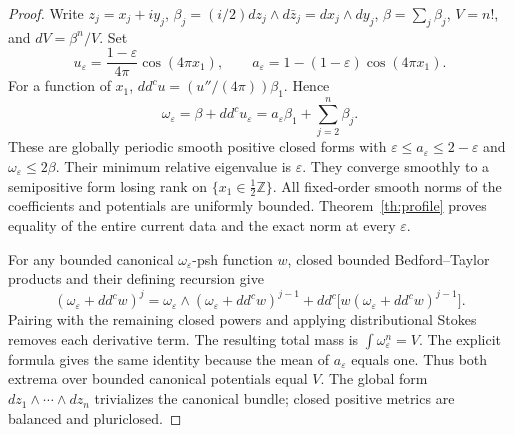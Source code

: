 \documentclass[11pt]{article}
\newcommand{\ddc}{dd^c}
\theoremstyle{remark}\newtheorem{remark}[theorem]{Remark}
\begin{document}
\begin{proof}
Write $z_j=x_j+iy_j$,
$\beta_j=(i/2)dz_j\wedge d\bar z_j=dx_j\wedge dy_j$,
$\beta=\sum_j\beta_j$, $V=n!$, and $dV=\beta^n/V$.
Set
\[
 u_\varepsilon=\frac{1-\varepsilon}{4\pi}\cos(4\pi x_1),
 \qquad a_\varepsilon=1-(1-\varepsilon)\cos(4\pi x_1).
\]
For a function of $x_1$, $\ddc u=(u''/(4\pi))\beta_1$.
Hence
\[
 \omega_\varepsilon=\beta+\ddc u_\varepsilon
 =a_\varepsilon\beta_1+\sum_{j=2}^n\beta_j.
\]
These are globally periodic smooth positive closed forms with
$\varepsilon\leq a_\varepsilon\leq2-\varepsilon$ and
$\omega_\varepsilon\leq2\beta$. Their minimum relative eigenvalue
is $\varepsilon$. They converge smoothly to a semipositive form
losing rank on $\{x_1\in\tfrac12\mathbb Z\}$.
All fixed-order smooth norms of the coefficients and potentials are
uniformly bounded. Theorem~\ref{th:profile} proves equality of the
entire current data and the exact norm at every $\varepsilon$.

For any bounded canonical $\omega_\varepsilon$-psh function $w$,
closed bounded Bedford--Taylor products \cite[Section 2]{BT} and their
defining recursion give
\[
 (\omega_\varepsilon+\ddc w)^j
 =\omega_\varepsilon\wedge(\omega_\varepsilon+\ddc w)^{j-1}
    +\ddc\bigl[w(\omega_\varepsilon+\ddc w)^{j-1}\bigr].
\]
Pairing with the remaining closed powers and applying distributional
Stokes removes each derivative term. The resulting total mass is
$\int\omega_\varepsilon^n=V$. The explicit formula gives the same
identity because the mean of $a_\varepsilon$ equals one.
Thus both extrema over bounded
canonical potentials equal $V$. The global form
$dz_1\wedge\cdots\wedge dz_n$ trivializes the canonical bundle;
closed positive metrics are balanced and pluriclosed.
\end{proof}
\end{document}
